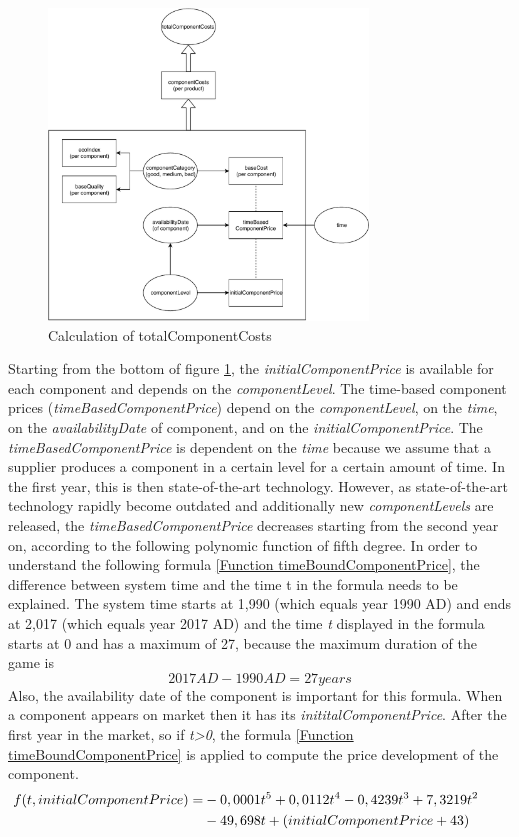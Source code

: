 \begin{figure} [!htbp]
	\centering
	\includegraphics[width=8.5cm]{images/totalComponentCosts.pdf}
	\caption{Calculation of totalComponentCosts}
	\label{img:totalComponentCosts}
\end{figure}
Starting from the bottom of figure \ref{img:totalComponentCosts}, the \textit{initialComponentPrice} is available for each component and depends on the \textit{componentLevel}.
The time-based component prices (\textit{timeBasedComponentPrice}) depend on the \textit{componentLevel}, on the \textit{time}, on the \textit{availabilityDate} of component, and on the \textit{initialComponentPrice}.
The \textit{timeBasedComponentPrice} is dependent on the \textit{time} because we assume that a supplier produces a component in a certain level for a certain amount of time. In the first year, this is then state-of-the-art technology. However, as state-of-the-art technology rapidly become outdated and additionally new \textit{componentLevels} are released, the \textit{timeBasedComponentPrice} decreases starting from the second year on, according to the following polynomic function of fifth degree. In order to understand the following formula \ref{Function timeBoundComponentPrice}, the difference between system time and the time t in the formula needs to be explained. The system time starts at 1,990 (which equals year 1990 AD) and ends at 2,017 (which equals year 2017 AD) and the time \textit{t} displayed in the formula starts at 0 and has a maximum of 27, because the maximum duration of the game is 
\begin{equation}
    2017 AD - 1990 AD = 27 years
\end{equation} 
Also, the availability date of the component is important for this formula. When a component appears on market then it has its \textit{inititalComponentPrice}. After the first year in the market, so if \textit{t>0}, the formula \ref{Function timeBoundComponentPrice} is applied to compute the price development of the component. 
\begin{equation}
\label{Function timeBoundComponentPrice}
\begin{aligned}
   f(t, initialComponentPrice) = & - 0,0001t\textsuperscript{5} + 0,0112t\textsuperscript{4} - 0,4239t\textsuperscript{3} + 7,3219t\textsuperscript{2} \\
   & - 49,698t + (initialComponentPrice+43)&& 
\end{aligned}   
\end{equation}


